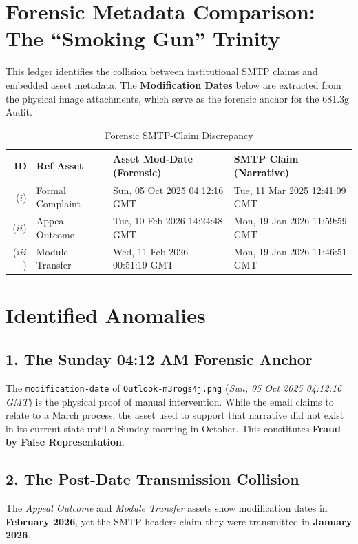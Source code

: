 \documentclass{embassy}
\begin{document}
\section*{Forensic Metadata Comparison:\\The ``Smoking Gun'' Trinity}
This ledger identifies the collision between institutional SMTP claims and embedded asset metadata. The \textbf{Modification Dates} below are extracted from the physical image attachments, which serve as the forensic anchor for the 681.3g Audit.

\begin{table}[h]
	\centering
	\small
	\begin{tabularx}{\textwidth}{r|l|X|X}
		\toprule
		\textbf{ID} & \textbf{Ref Asset} & \textbf{Asset Mod-Date (Forensic)} & \textbf{SMTP Claim (Narrative)} \\
		\midrule
		($i$)       & Formal Complaint   & Sun, 05 Oct 2025 04:12:16 GMT      & Tue, 11 Mar 2025 12:41:09 GMT   \\ \midrule
		($ii$)      & Appeal Outcome     & Tue, 10 Feb 2026 14:24:48 GMT      & Mon, 19 Jan 2026 11:59:59 GMT   \\ \midrule
		($iii$)     & Module Transfer    & Wed, 11 Feb 2026 00:51:19 GMT      & Mon, 19 Jan 2026 11:46:51 GMT   \\
		\bottomrule
	\end{tabularx}
	\caption{Forensic SMTP-Claim Discrepancy}
	\label{tab:smtp-claims}
\end{table}

\section*{Identified Anomalies}

\subsection*{1. The Sunday 04:12 AM Forensic Anchor}
The \texttt{modification-date} of \texttt{Outlook-m3rogs4j.png} (\textit{Sun, 05 Oct 2025 04:12:16 GMT}) is the physical proof of manual intervention. While the email claims to relate to a March process, the asset used to support that narrative did not exist in its current state until a Sunday morning in October. This constitutes \textbf{Fraud by False Representation}.

\subsection*{2. The Post-Date Transmission Collision}
The \textit{Appeal Outcome} and \textit{Module Transfer} assets show modification dates in \textbf{February 2026}, yet the SMTP headers claim they were transmitted in \textbf{January 2026}.
\end{document}
